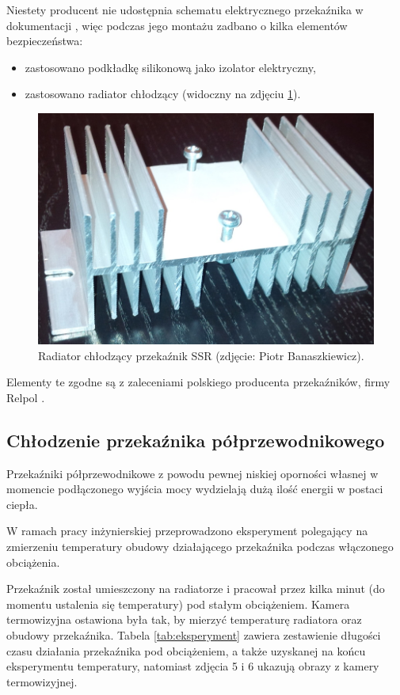 Niestety producent nie udostępnia schematu elektrycznego przekaźnika w dokumentacji \cite{ASR90DDH}, więc podczas jego montażu zadbano o kilka elementów bezpieczeństwa:

\begin{itemize}
\item zastosowano podkładkę silikonową jako izolator elektryczny,
\item zastosowano radiator chłodzący (widoczny na zdjęciu \ref{fig:radiator}).
\end{itemize}

\begin{figure}[h]
	\centering
	\includegraphics[scale=0.35]{pics/radiator.jpg}
	\caption{\label{fig:radiator}Radiator chłodzący przekaźnik SSR (zdjęcie: Piotr Banaszkiewicz).}
\end{figure}

Elementy te zgodne są z zaleceniami polskiego producenta przekaźników, firmy Relpol \cite{RELPOL}.

\subsection{Chłodzenie przekaźnika półprzewodnikowego}
\label{subsec:chlodzenie_SSR}

Przekaźniki półprzewodnikowe z powodu pewnej niskiej oporności własnej w momencie podłączonego wyjścia mocy wydzielają dużą ilość energii w postaci ciepła.

W ramach pracy inżynierskiej przeprowadzono eksperyment polegający na zmierzeniu temperatury obudowy działającego przekaźnika podczas włączonego obciążenia.

Przekaźnik został umieszczony na radiatorze i pracował przez kilka minut (do momentu ustalenia się temperatury) pod stałym obciążeniem. Kamera termowizyjna ostawiona była tak, by mierzyć temperaturę radiatora oraz obudowy przekaźnika. Tabela \ref{tab:eksperyment} zawiera zestawienie długości czasu działania przekaźnika pod obciążeniem, a także uzyskanej na końcu eksperymentu temperatury, natomiast zdjęcia 5 i 6 ukazują obrazy z kamery termowizyjnej.  %

